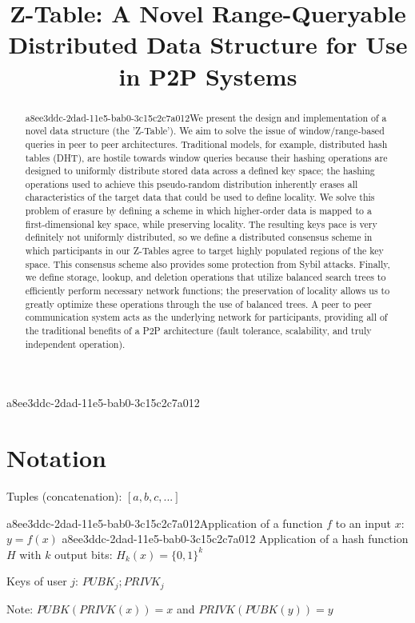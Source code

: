 \documentclass[12pt]{article}
\title{Z-Table: A Novel Range-Queryable Distributed Data Structure for Use in P2P Systems}
\begin{document}
a8ee3ddc-2dad-11e5-bab0-3c15c2c7a012\maketitle

\begin{abstract}
a8ee3ddc-2dad-11e5-bab0-3c15c2c7a012We present the design and implementation of a novel data structure (the 'Z-Table'). We aim to solve the issue of window/range-based queries in peer to peer architectures. Traditional models, for example,  distributed hash tables (DHT), are hostile towards window queries because their hashing operations are designed to uniformly distribute stored data across a defined key space; the hashing operations used to achieve this pseudo-random distribution inherently erases all characteristics of the target data that could be used to define locality. We solve this problem of erasure by defining a scheme in which higher-order data is mapped to a first-dimensional key space, while preserving locality. The resulting keys pace is very definitely not uniformly distributed, so we define a distributed consensus scheme in which participants in our Z-Tables agree to target highly populated regions of the key space. This consensus scheme also provides some protection from Sybil attacks. Finally, we define storage, lookup, and deletion operations that utilize balanced search trees to efficiently perform necessary network functions; the preservation of locality allows us to greatly optimize these operations through the use of balanced trees. A peer to peer communication system acts as the underlying network for participants, providing all of the traditional benefits of a P2P architecture (fault tolerance, scalability, and truly independent operation).
\end{abstract}

\section{Notation}

Tuples (concatenation): $[a,b,c,...]$

a8ee3ddc-2dad-11e5-bab0-3c15c2c7a012Application of a function $f$ to an input $x$: $y=f(x)$
a8ee3ddc-2dad-11e5-bab0-3c15c2c7a012
Application of a hash function $H$ with $k$ output bits: $H_{k}(x) = \{0,1\}^k$

Keys of user $j$: $ PUBK_j; PRIVK_j $

Note: $PUBK(PRIVK(x)) = x$ and $PRIVK(PUBK(y)) = y$~
\end{document}
